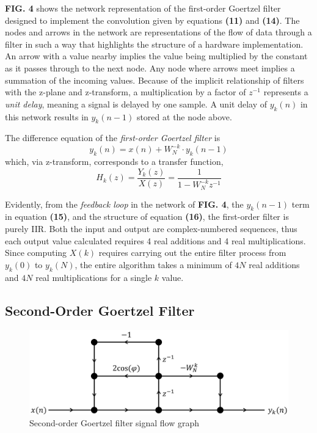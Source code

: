 \documentclass[reprint,amsmath,amssymb]{revtex4-2}
\begin{document}
\textbf{FIG. 4} shows the network representation of the first-order Goertzel filter designed to implement the convolution given by equations \textbf{(11)} and \textbf{(14)}. The nodes and arrows in the network are representations of the flow of data through a filter in such a way that highlights the structure of a hardware implementation. An arrow with a value nearby implies the value being multiplied by the constant as it passes through to the next node. Any node where arrows meet implies a summation of the incoming values. Because of the implicit relationship of filters with the z-plane and z-transform, a multiplication by a factor of $z^{-1}$ represents a \textit{unit delay}, meaning a signal is delayed by one sample. A unit delay of $y_k(n)$ in this network results in $y_k(n-1)$ stored at the node above.

The difference equation of the \textit{first-order Goertzel filter} is
\begin{equation}
    y_k(n) = x(n) + W_N^{-k}\cdot y_k(n-1)
\end{equation}
which, via z-transform, corresponds to a transfer function,
\begin{equation}
    H_k(z) = \frac{Y_k(z)}{X(z)} = \frac{1}{1-W_N^{-k}z^{-1}}
\end{equation}

Evidently, from the \textit{feedback loop} in the network of \textbf{FIG. 4}, the $y_k(n-1)$ term in equation \textbf{(15)}, and the structure of equation \textbf{(16)}, the first-order filter is purely IIR. Both the input and output are complex-numbered sequences, thus each output value calculated requires 4 real additions and 4 real multiplications. Since computing $X(k)$ requires carrying out the entire filter process from $y_k(0)$ to $y_k(N)$, the entire algorithm takes a minimum of $4N$ real additions and $4N$ real multiplications for a single $k$ value.

\subsection{Second-Order Goertzel Filter}

\begin{figure}
    \centering
    \includegraphics[width=0.7\linewidth]{figs/goertzel_network2.png}
    \caption{Second-order Goertzel filter signal flow graph}
    \label{fig:5}
\end{figure}
\end{document}
